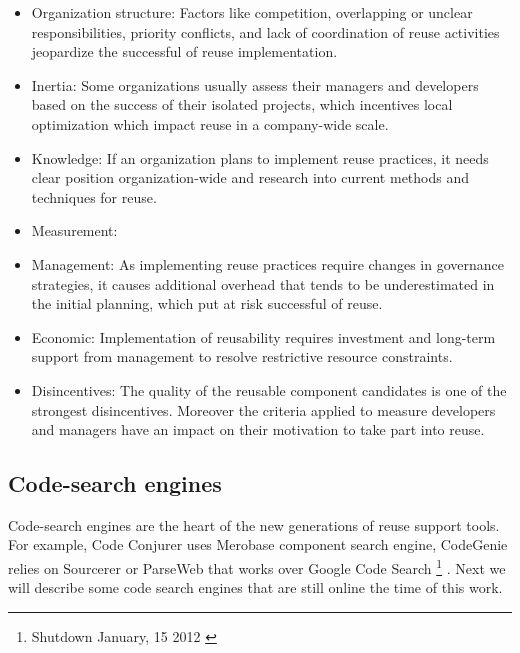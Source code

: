 \begin{itemize}
\item Organization structure: Factors like competition, overlapping or unclear responsibilities, priority conflicts, and lack of coordination of reuse activities jeopardize the successful of reuse implementation. 
\item Inertia: Some organizations usually assess their managers and developers based on the success of their isolated projects, which incentives local optimization which impact reuse in a company-wide scale. 
\item Knowledge: If an organization plans to implement reuse practices, it needs clear position organization-wide and research into current methods and techniques for reuse.
\item Measurement: 
\item Management: As implementing reuse practices require changes in governance strategies, it causes additional overhead that tends to be underestimated in the initial planning, which put at risk successful of reuse.
\item Economic: Implementation of reusability requires investment and long-term support from management to resolve restrictive resource constraints.
\item Disincentives: The quality of the reusable component candidates is one of the strongest disincentives. Moreover the criteria applied to measure developers and managers have an impact on their motivation to take part into reuse.
\end{itemize}

\subsection{Code-search engines}
Code-search engines are the heart of the new generations of reuse support tools. For example, Code Conjurer \citep{Hummel2008} uses Merobase component search engine, CodeGenie relies on Sourcerer \citep{Lemos2007} or ParseWeb that works over Google Code Search \footnote{Shutdown January, 15 2012 \citep{Horowitz2011}} \citep{Thummalapenta2007}. Next we will describe some code search engines that are still online the time of this work.

